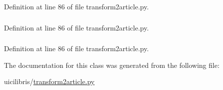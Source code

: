 \-Definition at line 86 of file transform2article.\-py.

\hypertarget{classuicilibris_1_1transform2article_1_1tableState_ab7266aa6235b2df1fca96c075832712e}{
\subsubsection[{id}]{}}\label{classuicilibris_1_1transform2article_1_1tableState_ab7266aa6235b2df1fca96c075832712e}


\-Definition at line 86 of file transform2article.\-py.

\hypertarget{classuicilibris_1_1transform2article_1_1tableState_a75f57c28d5d9b5f99abce12cffe2d637}{
\subsubsection[{lines}]{}}\label{classuicilibris_1_1transform2article_1_1tableState_a75f57c28d5d9b5f99abce12cffe2d637}


\-Definition at line 86 of file transform2article.\-py.



\-The documentation for this class was generated from the following file\-:\begin{DoxyCompactItemize}
\item 
uicilibris/\hyperlink{transform2article_8py}{transform2article.\-py}\end{DoxyCompactItemize}
